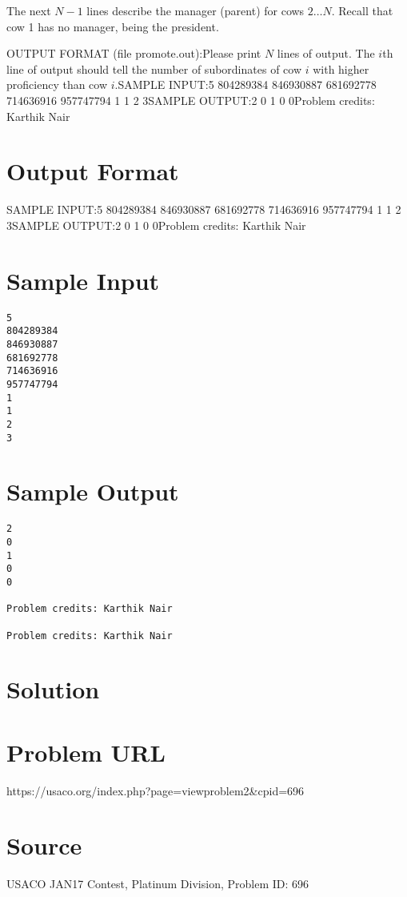 \documentclass[12pt]{article}
\begin{document}
The next $N-1$ lines describe the manager (parent) for cows $2 \ldots N$. 
Recall that cow 1 has no manager, being the president.

OUTPUT FORMAT (file promote.out):Please print $N$ lines of output.  The $i$th line of output should tell the
number of subordinates of cow $i$ with higher proficiency than cow $i$.SAMPLE INPUT:5
804289384
846930887
681692778
714636916
957747794
1
1
2
3SAMPLE OUTPUT:2
0
1
0
0Problem credits: Karthik Nair

\section*{Output Format}
SAMPLE INPUT:5
804289384
846930887
681692778
714636916
957747794
1
1
2
3SAMPLE OUTPUT:2
0
1
0
0Problem credits: Karthik Nair

\section*{Sample Input}
\begin{verbatim}
5
804289384
846930887
681692778
714636916
957747794
1
1
2
3
\end{verbatim}

\section*{Sample Output}
\begin{verbatim}
2
0
1
0
0

Problem credits: Karthik Nair

Problem credits: Karthik Nair
\end{verbatim}

\section*{Solution}


\section*{Problem URL}
https://usaco.org/index.php?page=viewproblem2&cpid=696

\section*{Source}
USACO JAN17 Contest, Platinum Division, Problem ID: 696
\end{document}
